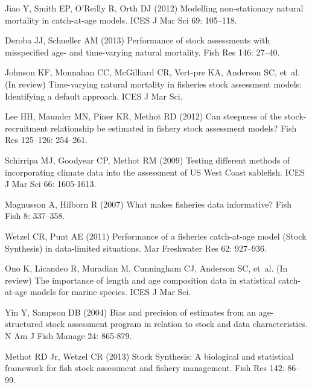 \documentclass[11pt]{article}
\begin{document}
\begin{thebibliography}{10}
Jiao Y, Smith EP, O'Reilly R, Orth DJ (2012) Modelling non-stationary natural
  mortality in catch-at-age models.
\newblock ICES J Mar Sci 69: 105--118.

Deroba JJ, Schueller AM (2013) Performance of stock assessments with
  misspecified age- and time-varying natural mortality.
\newblock Fish Res 146: 27--40.

Johnson KF, Monnahan CC, McGilliard CR, Vert-pre KA, Anderson SC, et~al. (In review)
  Time-varying natural mortality in fisheries stock assessment models:
  Identifying a default approach.
\newblock ICES J Mar Sci.

Lee HH, Maunder MN, Piner KR, Methot RD (2012) Can steepness of the
  stock-recruitment relationship be estimated in fishery stock assessment
  models?
\newblock Fish Res 125--126: 254--261.

Schirripa MJ, Goodyear CP, Methot RM (2009) Testing different methods of
  incorporating climate data into the assessment of {US West Coast} sablefish.
\newblock ICES J Mar Sci 66: 1605-1613.

Magnusson A, Hilborn R (2007) What makes fisheries data informative?
\newblock Fish Fish 8: 337--358.

Wetzel CR, Punt AE (2011) Performance of a fisheries catch-at-age model ({Stock
  Synthesis}) in data-limited situations.
\newblock Mar Freshwater Res 62: 927--936.

Ono K, Licandeo R, Muradian M, Cunningham CJ, Anderson SC, et~al. (In review) The
  importance of length and age composition data in statistical catch-at-age
  models for marine species.
\newblock ICES J Mar Sci.

Yin Y, Sampson DB (2004) Bias and precision of estimates from an age-structured
  stock assessment program in relation to stock and data characteristics.
\newblock N Am J Fish Manage 24: 865-879.

Methot RD Jr, Wetzel CR (2013) {Stock Synthesis}: A biological and statistical
  framework for fish stock assessment and fishery management.
\newblock Fish Res 142: 86--99.


\end{thebibliography}
\end{document}
